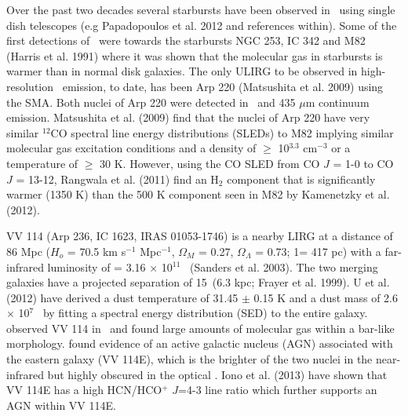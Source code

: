 Over the past two decades several starbursts have been observed in \cosix\ using single dish telescopes (e.g Papadopoulos et al. 2012 and references within).\nocite{2012ApJ...751...10P} Some of the first detections of \cosix\ were towards the starbursts NGC 253, IC 342 and M82 (Harris et al. 1991) \nocite{1991ApJ...382L..75H}where it was shown that the molecular gas in starbursts is warmer than in normal disk galaxies. The only ULIRG to be observed in high-resolution \cosix\ emission, to date, has been Arp 220 (Matsushita et al. 2009) \nocite{2009ApJ...693...56M}using the SMA. Both nuclei of Arp 220 were detected in \cosix\ and 435 $\mu$m continuum emission. Matsushita et al. (2009) find that the nuclei of Arp 220 have very similar $^{12}$CO spectral line energy distributions (SLEDs) to M82 implying similar molecular gas excitation conditions and a density of $\geq$ 10$^{3.3}$ cm$^{-3}$ or a temperature of $\geq$ 30 K. However, using the CO SLED from CO $J$ = 1-0 to CO $J$ = 13-12, Rangwala et al. (2011) find an H$_{2}$ component that is significantly warmer (1350 K) than the 500 K component seen in M82 by Kamenetzky et al. (2012).

VV 114 (Arp 236, IC 1623, IRAS 01053-1746) is a nearby LIRG at a distance of 86 Mpc ($H_{o}$ = 70.5 km s$^{-1}$ Mpc$^{-1}$, $\Omega_{M}$ =  0.27, $\Omega_{\Lambda}$ =  0.73; 1\arcsec = 417 pc) with a far-infrared luminosity of \lfir = 3.16 $\times$ 10$^{11}$ \lsol\ (Sanders et al. 2003)\nocite{2003AJ....126.1607S}. The two merging galaxies have a projected separation of 15\arcsec\ (6.3 kpc; Frayer et al. 1999)\nocite{1999AJ....118..139F}. U et al. (2012) \nocite{2012ApJS..203....9U}have derived a dust temperature of 31.45 $\pm$ 0.15 K and a dust mass of  2.6 $\times$ 10$^{7}$ \msol\ by fitting a spectral energy distribution (SED) to the entire galaxy. \cite{1994ApJ...430L.109Y} observed VV 114 in \coone\ and found large amounts of molecular gas within a bar-like morphology. \cite{2002A&A...391..417L} found evidence of an active galactic nucleus (AGN) associated with the eastern galaxy (VV 114E), which is the brighter of the two nuclei in the near-infrared \citep{2000AJ....119..991S} but highly obscured in the optical \citep{1994AJ....107..920K}. Iono et al. (2013)\nocite{2013PASJ...65L...7I} have shown that VV 114E has a high HCN/HCO$^{+}$ $J$=4-3 line ratio which further supports an AGN within VV 114E. 

